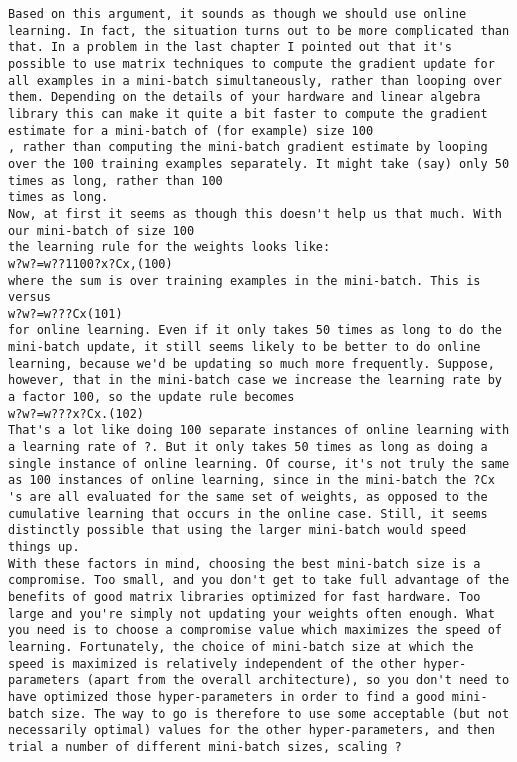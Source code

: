 \begin{lstlisting}
Based on this argument, it sounds as though we should use online learning. In fact, the situation turns out to be more complicated than that. In a problem in the last chapter I pointed out that it's possible to use matrix techniques to compute the gradient update for all examples in a mini-batch simultaneously, rather than looping over them. Depending on the details of your hardware and linear algebra library this can make it quite a bit faster to compute the gradient estimate for a mini-batch of (for example) size 100
, rather than computing the mini-batch gradient estimate by looping over the 100 training examples separately. It might take (say) only 50 times as long, rather than 100
times as long.
Now, at first it seems as though this doesn't help us that much. With our mini-batch of size 100
the learning rule for the weights looks like: 
w?w?=w??1100?x?Cx,(100)
where the sum is over training examples in the mini-batch. This is versus 
w?w?=w???Cx(101)
for online learning. Even if it only takes 50 times as long to do the mini-batch update, it still seems likely to be better to do online learning, because we'd be updating so much more frequently. Suppose, however, that in the mini-batch case we increase the learning rate by a factor 100, so the update rule becomes 
w?w?=w???x?Cx.(102)
That's a lot like doing 100 separate instances of online learning with a learning rate of ?. But it only takes 50 times as long as doing a single instance of online learning. Of course, it's not truly the same as 100 instances of online learning, since in the mini-batch the ?Cx
's are all evaluated for the same set of weights, as opposed to the cumulative learning that occurs in the online case. Still, it seems distinctly possible that using the larger mini-batch would speed things up.
With these factors in mind, choosing the best mini-batch size is a compromise. Too small, and you don't get to take full advantage of the benefits of good matrix libraries optimized for fast hardware. Too large and you're simply not updating your weights often enough. What you need is to choose a compromise value which maximizes the speed of learning. Fortunately, the choice of mini-batch size at which the speed is maximized is relatively independent of the other hyper-parameters (apart from the overall architecture), so you don't need to have optimized those hyper-parameters in order to find a good mini-batch size. The way to go is therefore to use some acceptable (but not necessarily optimal) values for the other hyper-parameters, and then trial a number of different mini-batch sizes, scaling ?

\end{lstlisting}
